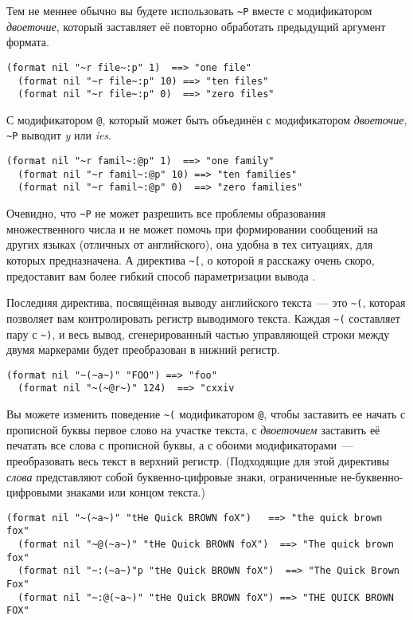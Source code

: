 Тем не меннее обычно вы будете использовать \lstinline!~P! вместе с модификатором
\textit{двоеточие}, который заставляет её повторно обработать предыдущий аргумент формата.

\begin{lstlisting}[style=lisprepl]
  (format nil "~r file~:p" 1)  ==> "one file"
  (format nil "~r file~:p" 10) ==> "ten files"
  (format nil "~r file~:p" 0)  ==> "zero files"
\end{lstlisting}

С модификатором \lstinline!@!, который может быть объединён с модификатором
\textit{двоеточие}, \lstinline!~P! выводит \textit{y} или \textit{ies}.

\begin{lstlisting}[style=lisprepl]
  (format nil "~r famil~:@p" 1)  ==> "one family"
  (format nil "~r famil~:@p" 10) ==> "ten families"
  (format nil "~r famil~:@p" 0)  ==> "zero families"
\end{lstlisting}

Очевидно, что \lstinline!~P! не может разрешить все проблемы образования множественного
числа и не может помочь при формировании сообщений на других языках (отличных от
английского), она удобна в тех ситуациях, для которых предназначена. А директива
\lstinline!~[!, о которой я расскажу очень скоро, предоставит вам более гибкий способ
параметризации вывода .

Последняя директива, посвящённая выводу английского текста~--- это \lstinline!~(!, которая
позволяет вам контролировать регистр выводимого текста. Каждая \lstinline!~(! составляет
пару с \lstinline!~)!, и весь вывод, сгенерированный частью управляющей строки между двумя
маркерами будет преобразован в нижний регистр.

\begin{lstlisting}[style=lisprepl]
  (format nil "~(~a~)" "FOO") ==> "foo"
  (format nil "~(~@r~)" 124)  ==> "cxxiv
\end{lstlisting}

Вы можете изменить поведение \lstinline!~(! модификатором \lstinline!@!, чтобы заставить
ее начать с прописной буквы первое слово на участке текста, с \textit{двоеточием}
заставить её печатать все слова с прописной буквы, а с обоими модификаторами~---
преобразовать весь текст в верхний регистр. (Подходящие для этой директивы \textit{слова}
представляют собой буквенно-цифровые знаки, ограниченные не-буквенно-цифровыми знаками или
концом текста.)

\begin{lstlisting}[style=lisprepl]
  (format nil "~(~a~)" "tHe Quick BROWN foX")   ==> "the quick brown fox"
  (format nil "~@(~a~)" "tHe Quick BROWN foX")  ==> "The quick brown fox"
  (format nil "~:(~a~)"p "tHe Quick BROWN foX")  ==> "The Quick Brown Fox"
  (format nil "~:@(~a~)" "tHe Quick BROWN foX") ==> "THE QUICK BROWN FOX"
\end{lstlisting}

